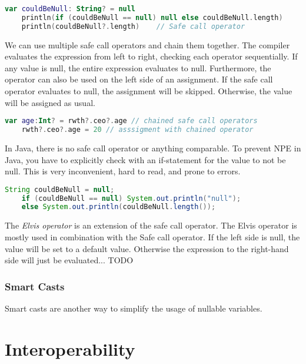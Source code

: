 \documentclass[a4paper, 11pt]{article}
\begin{document}
  \begin{lstlisting}[language=Kotlin,title={Using the safe call operator in comparison to an if statement}]
    var couldBeNull: String? = null
    println(if (couldBeNull == null) null else couldBeNull.length)
    println(couldBeNull?.length)    // Safe call operator
  \end{lstlisting}
  We can use multiple safe call operators and chain them together. The compiler evaluates the expression from left to right, checking each operator sequentially. If any value is null, the entire expression evaluates to null.
  Furthermore, the operator can also be used on the left side of an assignment. If the safe call operator evaluates to null, the assignment will be skipped. Otherwise, the value will be assigned as usual.
  \begin{lstlisting}[language=Kotlin]
    var age:Int? = rwth?.ceo?.age // chained safe call operators
    rwth?.ceo?.age = 20 // asssigment with chained operator
  \end{lstlisting}

  In Java, there is no safe call operator or anything comparable. To prevent NPE in Java, you have to explicitly check with an if-statement for the value to not be null. This is very inconvenient, hard to read, and prone to errors.
  \begin{lstlisting}[language=Java,title={Prevent NPE in Java}]
    String couldBeNull = null;
    if (couldBeNull == null) System.out.println("null");
    else System.out.println(couldBeNull.length());
  \end{lstlisting}
  \hfill \break

  The \textit{Elvis operator} is an extension of the safe call operator. The Elvis operator is mostly used in combination with the Safe call operator. If the left side is null, the value will be set to a default value. Otherwise the expression to the right-hand side will just be evaluated... TODO

\subsubsection{Smart Casts}
  Smart casts are another way to simplify the usage of nullable variables.


\section{Interoperability}
\end{document}
